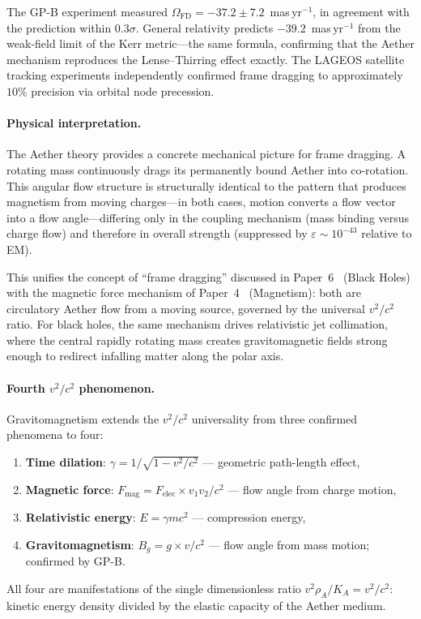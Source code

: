 ﻿\documentclass[12pt,letterpaper]{article}
\newcommand{\rhoa}{\rho_{\!A}}
\newcommand{\Ka}{K_{\!A}}
\begin{document}
The GP-B experiment measured $\Omega_{\mathrm{FD}} = -37.2 \pm 7.2$~mas\,yr$^{-1}$,
in agreement with the prediction within $0.3\sigma$.
General relativity predicts $-39.2$~mas\,yr$^{-1}$ from the weak-field limit of
the Kerr metric---the same formula, confirming that the Aether mechanism
reproduces the Lense--Thirring effect exactly.
The LAGEOS satellite tracking experiments independently confirmed frame dragging
to approximately $10\%$ precision via orbital node precession.

\paragraph{Physical interpretation.}
The Aether theory provides a concrete mechanical picture for frame dragging.
A rotating mass continuously drags its permanently bound Aether into
co-rotation.  This angular flow structure is structurally identical to the
pattern that produces magnetism from moving charges---in both cases, motion
converts a flow vector into a flow angle---differing only in the coupling
mechanism (mass binding versus charge flow) and therefore in overall strength
(suppressed by $\varepsilon \sim 10^{-43}$ relative to EM).

This unifies the concept of ``frame dragging'' discussed in Paper~6~\cite{otto-cosmology}
(Black Holes) with the magnetic force mechanism of Paper~4~\cite{otto-em} (Magnetism):
both are circulatory Aether flow from a moving source, governed by the
universal $v^2/c^2$ ratio.  For black holes, the same mechanism drives
relativistic jet collimation, where the central rapidly rotating mass
creates gravitomagnetic fields strong enough to redirect infalling matter
along the polar axis.

\paragraph{Fourth $v^2/c^2$ phenomenon.}
Gravitomagnetism extends the $v^2/c^2$ universality from three confirmed
phenomena to four:
\begin{enumerate}[label=(\alph*)]
  \item \textbf{Time dilation}: $\gamma = 1/\sqrt{1 - v^2/c^2}$
        --- geometric path-length effect,
  \item \textbf{Magnetic force}: $F_{\mathrm{mag}} = F_{\mathrm{elec}}
        \times v_1 v_2/c^2$ --- flow angle from charge motion,
  \item \textbf{Relativistic energy}: $E = \gamma mc^2$
        --- compression energy,
  \item \textbf{Gravitomagnetism}: $B_g = g\times v/c^2$
        --- flow angle from mass motion; confirmed by GP-B.
\end{enumerate}
All four are manifestations of the single dimensionless ratio
$v^2 \rhoa / \Ka = v^2/c^2$: kinetic energy density divided by the
elastic capacity of the Aether medium.
\end{document}
